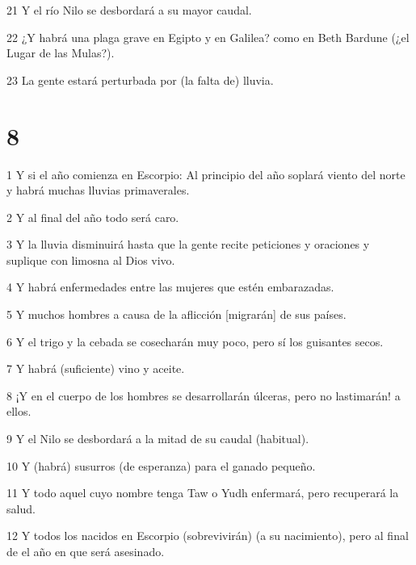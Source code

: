 \par 21 Y el río Nilo se desbordará a su mayor caudal.

\par 22 ¿Y habrá una plaga grave en Egipto y en Galilea? como en Beth Bardune (¿el Lugar de las Mulas?).

\par 23 La gente estará perturbada por (la falta de) lluvia.

\chapter{8}

\par 1 Y si el año comienza en Escorpio: Al principio del año soplará viento del norte y habrá muchas lluvias primaverales.

\par 2 Y al final del año todo será caro.

\par 3 Y la lluvia disminuirá hasta que la gente recite peticiones y oraciones y suplique con limosna al Dios vivo.

\par 4 Y habrá enfermedades entre las mujeres que estén embarazadas.

\par 5 Y muchos hombres a causa de la aflicción [migrarán] de sus países.

\par 6 Y el trigo y la cebada se cosecharán muy poco, pero sí los guisantes secos.

\par 7 Y habrá (suficiente) vino y aceite.

\par 8 ¡Y en el cuerpo de los hombres se desarrollarán úlceras, pero no lastimarán! a ellos.

\par 9 Y el Nilo se desbordará a la mitad de su caudal (habitual).

\par 10 Y (habrá) susurros (de esperanza) para el ganado pequeño.

\par 11 Y todo aquel cuyo nombre tenga Taw o Yudh enfermará, pero recuperará la salud.

\par 12 Y todos los nacidos en Escorpio (sobrevivirán) (a su nacimiento), pero al final de
el año en que será asesinado.


